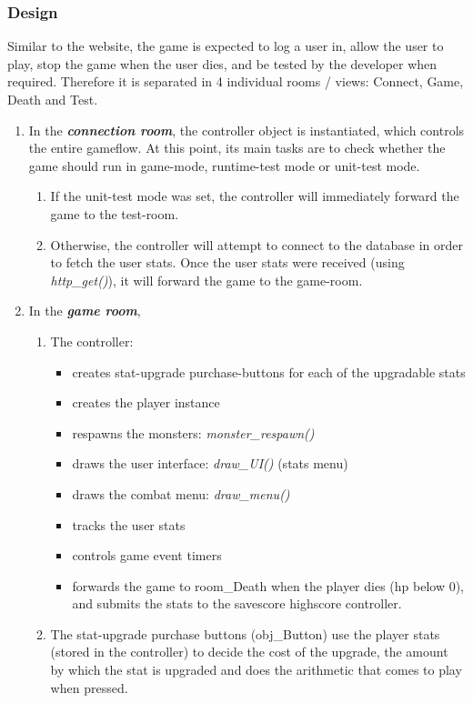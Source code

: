 \documentclass[12pt]{report}
\begin{document}
\subsubsection{Design}
Similar to the website, the game is expected to log a user in, allow the user to play, stop the game when the user dies, and be tested by the developer when required. Therefore it is separated in 4 individual rooms / views: Connect, Game, Death and Test.
\begin{enumerate}
\item In the \emph{\textbf{connection room}}, the controller object is instantiated, which controls the entire gameflow. At this point, its main tasks are to check whether the game should run in game-mode, runtime-test mode or unit-test mode.
\begin{enumerate}
\item If the unit-test mode was set, the controller will immediately forward the game to the test-room.
\item Otherwise, the controller will attempt to connect to the database in order to fetch the user stats. Once the user stats were received (using \textsl{http\_get()}), it will forward the game to the game-room.
\end{enumerate} 
\item In the \emph{\textbf{game room}}, 
\begin{enumerate}
\item The controller: 
\begin{itemize}
\item creates stat-upgrade purchase-buttons for each of the upgradable stats
\item creates the player instance
\item respawns the monsters: \textsl{monster\_respawn()}
\item draws the user interface: \textsl{draw\_UI()} (stats menu)
\item draws the combat menu: \textsl{draw\_menu()}
\item tracks the user stats
\item controls game event timers
\item forwards the game to room\_Death when the player dies (hp below 0), and submits the stats to the savescore highscore controller.
\end{itemize}  
\item The stat-upgrade purchase buttons (obj\_Button) use the player stats (stored in the controller) to decide the cost of the upgrade, the amount by which the stat is upgraded and does the arithmetic that comes to play when pressed.

\end{enumerate}
\end{enumerate}
\end{document}
